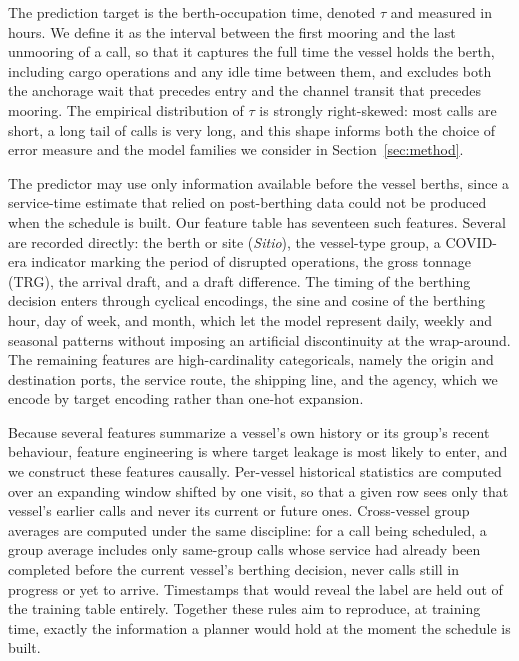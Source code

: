 The prediction target is the berth-occupation time, denoted $\tau$ and measured in
hours. We define it as the interval between the first mooring and the last
unmooring of a call, so that it captures the full time the vessel holds the berth,
including cargo operations and any idle time between them, and excludes both the
anchorage wait that precedes entry and the channel transit that precedes mooring.
The empirical distribution of $\tau$ is strongly right-skewed: most calls are
short, a long tail of calls is very long, and this shape informs both the choice of
error measure and the model families we consider in Section~\ref{sec:method}.

The predictor may use only information available before the vessel berths, since a
service-time estimate that relied on post-berthing data could not be produced when
the schedule is built. Our feature table has seventeen such features. Several are
recorded directly: the berth or site (\emph{Sitio}), the vessel-type group, a
COVID-era indicator marking the period of disrupted operations, the gross tonnage
(TRG), the arrival draft, and a draft difference. The timing of the berthing
decision enters through cyclical encodings, the sine and cosine of the berthing
hour, day of week, and month, which let the model represent daily, weekly and
seasonal patterns without imposing an artificial discontinuity at the wrap-around.
The remaining features are high-cardinality categoricals, namely the origin and
destination ports, the service route, the shipping line, and the agency, which we
encode by target encoding rather than one-hot expansion.

Because several features summarize a vessel's own history or its group's recent
behaviour, feature engineering is where target leakage is most likely to enter, and
we construct these features causally. Per-vessel historical statistics are computed
over an expanding window shifted by one visit, so that a given row sees only that
vessel's earlier calls and never its current or future ones. Cross-vessel group
averages are computed under the same discipline: for a call being scheduled, a
group average includes only same-group calls whose service had already been
completed before the current vessel's berthing decision, never calls still in
progress or yet to arrive. Timestamps that would reveal the label are held out of
the training table entirely. Together these rules aim to reproduce, at training
time, exactly the information a planner would hold at the moment the schedule is
built.

